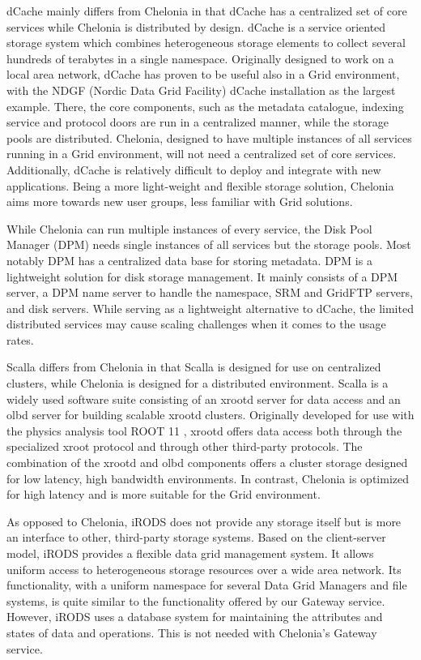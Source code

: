 \documentclass[preprint,12pt]{elsarticle}
\begin{document}
dCache \cite{} mainly differs from Chelonia in that dCache has a
centralized set of core services while Chelonia is distributed by
design. dCache is a service oriented storage system which combines
heterogeneous storage elements to collect several hundreds of
terabytes in a single namespace. Originally designed to work on a
local area network, dCache has proven to be useful also in a Grid
environment, with the NDGF (Nordic Data Grid Facility) dCache
installation as the largest example. There, the core components, such
as the metadata catalogue, indexing service and protocol doors are run
in a centralized manner, while the storage pools are
distributed. Chelonia, designed to have multiple instances of all
services running in a Grid environment, will not need a centralized
set of core services. Additionally, dCache is relatively difficult to
deploy and integrate with new applications. Being a more light-weight
and flexible storage solution, Chelonia aims more towards new user
groups, less familiar with Grid solutions.

While Chelonia can run multiple instances of every service, the Disk
Pool Manager \cite{} (DPM) needs single instances of all services but the
storage pools. Most notably DPM has a centralized data base for
storing metadata. DPM is a lightweight solution for disk storage
management. It mainly consists of a DPM server, a DPM name server to
handle the namespace, SRM and GridFTP servers, and disk servers.
While serving as a lightweight alternative to dCache, the limited
distributed services may cause scaling challenges when it comes to the
usage rates.

Scalla \cite{} differs from Chelonia in that Scalla is designed for
use on centralized clusters, while Chelonia is designed for a
distributed environment. Scalla is a widely used software suite
consisting of an xrootd server for data access and an olbd server for
building scalable xrootd clusters. Originally developed for use with
the physics analysis tool ROOT 11 , xrootd offers data access both
through the specialized xroot protocol and through other third-party
protocols. The combination of the xrootd and olbd components offers a
cluster storage designed for low latency, high bandwidth
environments. In contrast, Chelonia is optimized for high latency and
is more suitable for the Grid environment.

As opposed to Chelonia, iRODS \cite{} does not provide any storage
itself but is more an interface to other, third-party storage
systems. Based on the client-server model, iRODS provides a flexible
data grid management system. It allows uniform access to heterogeneous
storage resources over a wide area network. Its functionality, with a
uniform namespace for several Data Grid Managers and file systems, is
quite similar to the functionality offered by our Gateway
service. However, iRODS uses a database system for maintaining the
attributes and states of data and operations. This is not needed with
Chelonia’s Gateway service.
\end{document}
